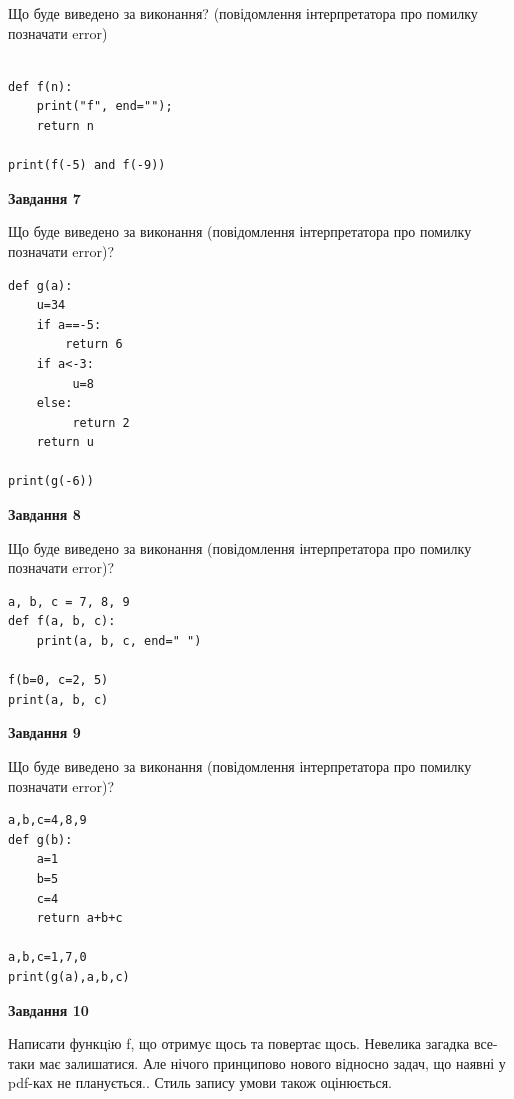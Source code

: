 \documentclass[12pt, ukrainian]{article}
\begin{document}
{\begin {large}
Що буде виведено за виконання? (повідомлення інтерпретатора про помилку позначати error)\par
\begin{verbatim}

def f(n):
    print("f", end="");
    return n

print(f(-5) and f(-9))
\end{verbatim}

{\begin {center}\textbf{Завдання 7}\end {center}}

Що буде виведено за виконання (повідомлення інтерпретатора про помилку позначати error)?\par
\begin{verbatim}
def g(a):
    u=34
    if a==-5: 
        return 6
    if a<-3:
         u=8
    else:
         return 2
    return u

print(g(-6))
\end{verbatim}

{\begin {center}\textbf{Завдання 8}\end {center}}

Що буде виведено за виконання (повідомлення інтерпретатора про помилку позначати error)?\par
\begin{verbatim}
a, b, c = 7, 8, 9
def f(a, b, c):
    print(a, b, c, end=" ")

f(b=0, c=2, 5)
print(a, b, c)
\end{verbatim}

{\begin {center}\textbf{Завдання 9}\end {center}}

Що буде виведено за виконання (повідомлення інтерпретатора про помилку позначати error)?\par
\begin{verbatim}
a,b,c=4,8,9
def g(b):
    a=1
    b=5
    c=4
    return a+b+c

a,b,c=1,7,0
print(g(a),a,b,c)
\end{verbatim}

{\begin {center}\textbf{Завдання 10}\end {center}}


Написати функцiю f, що отримує щось та повертає щось. Невелика загадка все-таки має залишатися. Але нічого принципово нового відносно задач, що наявні у pdf-ках не планується.. Стиль запису умови також оцінюється.\par
\end {large}}
\newpage
\end{document}
